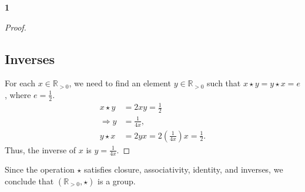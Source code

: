 \documentclass[12pt]{amsart}
\theoremstyle{definition}
\numberwithin{equation}{section}
\newcommand{\R}{\mathbb{R}}
\begin{document}
\begin{exercise}{\textbf{1}}
\begin{proof}
\subsection*{Inverses}
For each \(x \in \R_{>0}\), we need to find an element \(y \in \R_{>0}\) such that \(x \star y = y \star x = e\), where \(e = \frac{1}{2}\).
\begin{align*}
x \star y &= 2xy = \frac{1}{2} \\
\Rightarrow y &= \frac{1}{4x}, \\
y \star x &= 2y x = 2 \left(\frac{1}{4x}\right) x = \frac{1}{2}.
\end{align*}
Thus, the inverse of \(x\) is \(y = \frac{1}{4x}\).

\end{proof}

\noindent Since the operation \(\star\) satisfies closure, associativity, identity, and inverses, we conclude that \((\R_{>0}, \star)\) is a group.
\newpage
\end{exercise}
\newpage
\end{document}
